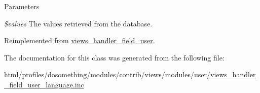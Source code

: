 \begin{DoxyParams}{Parameters}
\item[{\em \$values}]The values retrieved from the database. \end{DoxyParams}


Reimplemented from \hyperlink{classviews__handler__field__user_a145dcce889ee17821a1d9c65970d86f2}{views\_\-handler\_\-field\_\-user}.

The documentation for this class was generated from the following file:\begin{DoxyCompactItemize}
\item 
html/profiles/dosomething/modules/contrib/views/modules/user/\hyperlink{views__handler__field__user__language_8inc}{views\_\-handler\_\-field\_\-user\_\-language.inc}\end{DoxyCompactItemize}
